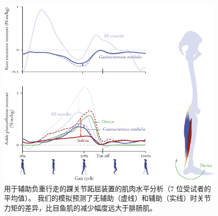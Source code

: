 \begin{figure}[!htb]
	\centering
	\includegraphics[width=1.0\linewidth]{chap11/11_20}
	\caption{用于辅助负重行走的踝关节跖屈装置的肌肉水平分析（7 位受试者的平均值）。
		我们的模拟预测了无辅助（虚线）和辅助（实线）时关节力矩的差异，比目鱼肌的减少幅度远大于腓肠肌\cite{dembia2017simulating}。 \label{fig:11_20}}
\end{figure}






